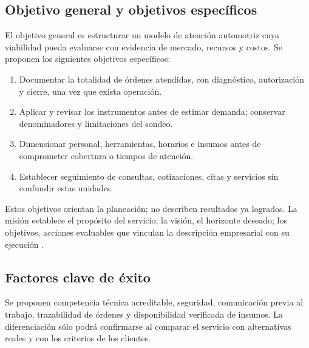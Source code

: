 {\subsection{Objetivo general y objetivos específicos}
El objetivo general es estructurar un modelo de atención automotriz cuya viabilidad pueda evaluarse con evidencia de mercado, recursos y costos. Se proponen los siguientes objetivos específicos:
\begin{enumerate}
\item Documentar la totalidad de órdenes atendidas, con diagnóstico, autorización y cierre, una vez que exista operación.
\item Aplicar y revisar los instrumentos antes de estimar demanda; conservar denominadores y limitaciones del sondeo.
\item Dimensionar personal, herramientas, horarios e insumos antes de comprometer cobertura o tiempos de atención.
\item Establecer seguimiento de consultas, cotizaciones, citas y servicios sin confundir estas unidades.
\end{enumerate}
Estos objetivos orientan la planeación; no describen resultados ya logrados. La misión establece el propósito del servicio; la visión, el horizonte deseado; los objetivos, acciones evaluables que vinculan la descripción empresarial con su ejecución \citep{openstaxPlanIntegrador}.
\subsection{Factores clave de éxito}
Se proponen competencia técnica acreditable, seguridad, comunicación previa al trabajo, trazabilidad de órdenes y disponibilidad verificada de insumos. La diferenciación sólo podrá confirmarse al comparar el servicio con alternativas reales y con los criterios de los clientes.
}
